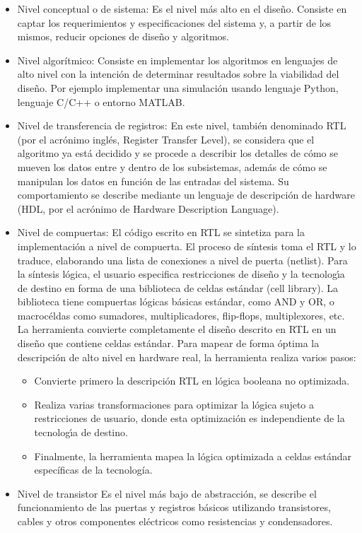 \begin{itemize}
\item
Nivel conceptual o de sistema:
Es el nivel más alto en el diseño. Consiste en captar los requerimientos y especificaciones del sistema y, a partir de los mismos, reducir opciones de diseño y algoritmos.

\item
Nivel algorítmico:
Consiste en implementar los algoritmos en lenguajes de alto nivel con la intención de determinar resultados sobre la viabilidad del diseño. Por ejemplo implementar una simulación usando lenguaje Python, lenguaje C/C++ o entorno MATLAB.
\item
Nivel de transferencia de registros:
En este nivel, también denominado RTL (por el acrónimo inglés, Register Transfer Level), se considera que el algoritmo ya está decidido y se procede a describir los detalles de cómo se mueven los datos entre y dentro de los subsistemas, además de cómo se manipulan los datos en función de las entradas del sistema. Su comportamiento se describe mediante un lenguaje de descripción de hardware (HDL, por el acrónimo de Hardware Description Language).
\item
Nivel de compuertas:
El código escrito en RTL se sintetiza para la implementación a nivel de compuerta. El proceso de síntesis toma el RTL y lo traduce, elaborando una lista de conexiones a nivel de puerta (netlist). Para la síntesis lógica, el usuario especifica restricciones de diseño y la tecnologı́a de destino en forma de una biblioteca de celdas estándar (cell library). La biblioteca tiene compuertas lógicas básicas estándar, como AND y OR, o macrocéldas como sumadores, multiplicadores, flip-flops, multiplexores, etc.
La herramienta convierte completamente el diseño descrito en RTL en un diseño que contiene celdas estándar. Para mapear de forma óptima la descripción de alto nivel en hardware real, la herramienta realiza varios pasos:
\begin{itemize}
\item
Convierte primero la descripción RTL en lógica booleana no optimizada.
\item
Realiza varias transformaciones para optimizar la lógica sujeto a restricciones de usuario, donde esta optimización es independiente de la tecnologı́a de destino.
\item
Finalmente, la herramienta mapea la lógica optimizada a celdas estándar específicas de la tecnología.
\end{itemize}


\item
Nivel de transistor
Es el nivel más bajo de abstracción, se describe el funcionamiento de las puertas y registros básicos utilizando transistores, cables y otros componentes eléctricos como resistencias y condensadores.

\end{itemize}



